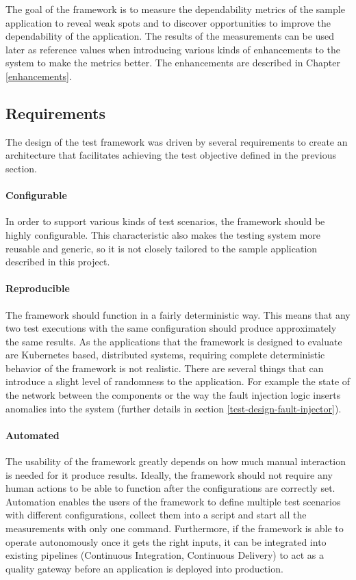 The goal of the framework is to measure the dependability metrics of the sample application to reveal weak spots and to discover opportunities to improve the dependability of the application. The results of the measurements can be used later as reference values when introducing various kinds of enhancements to the system to make the metrics better. The enhancements are described in Chapter \ref{enhancements}.

\subsection{Requirements} \label{test-design-req}

The design of the test framework was driven by several requirements to create an architecture that facilitates achieving the test objective defined in the previous section.

\paragraph{Configurable} In order to support various kinds of test scenarios, the framework should be highly configurable. This characteristic also makes the testing system more reusable and generic, so it is not closely tailored to the sample application described in this project.

\paragraph{Reproducible} The framework should function in a fairly deterministic way. This means that any two test executions with the same configuration should produce approximately the same results. As the applications that the framework is designed to evaluate are Kubernetes based, distributed systems, requiring complete deterministic behavior of the framework is not realistic. There are several things that can introduce a slight level of randomness to the application. For example the state of the network between the components or the way the fault injection logic inserts anomalies into the system (further details in section \ref{test-design-fault-injector}).

\paragraph{Automated} The usability of the framework greatly depends on how much manual interaction is needed for it produce results. Ideally, the framework should not require any human actions to be able to function after the configurations are correctly set. Automation enables the users of the framework to define multiple test scenarios with different configurations, collect them into a script and start all the measurements with only one command. Furthermore, if the framework is able to operate autonomously once it gets the right inputs, it can be integrated into existing pipelines (Continuous Integration, Continuous Delivery) to act as a quality gateway before an application is deployed into production.

